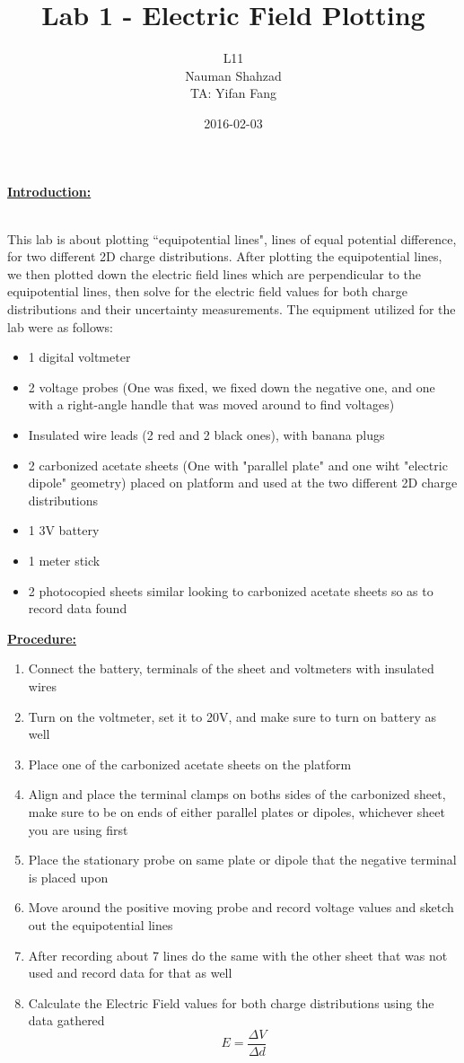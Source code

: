 \documentclass{report}
\title{\textbf{Lab 1 - Electric Field Plotting}}
\date{2016-02-03}
\author{L11\\ Nauman Shahzad\\TA: Yifan Fang}
\newcommand\tab[1][1cm]{\hspace*{#1}}
\begin{document}
\maketitle

\begin{flushleft}
{\Large \textbf{\underline{Introduction:}}}
\\\hspace{.1in}\\
{\large
 \tab This lab is about plotting ``equipotential lines", lines of equal potential difference, for two different 2D charge distributions.
After plotting the equipotential lines, we then plotted down the electric field lines which are perpendicular to the equipotential lines, then solve for the electric field values for both charge distributions and their uncertainty measurements.
The equipment utilized for the lab were as follows:
\begin{itemize}
\item 1 digital voltmeter
\item 2 voltage probes (One was fixed, we fixed down the negative one, and one with a right-angle handle that was moved around to find voltages)
\item Insulated wire leads (2 red and 2 black ones), with banana plugs
\item 2 carbonized acetate sheets (One with "parallel plate" and one wiht "electric dipole" geometry) placed on platform and used at the two different 2D charge distributions
\item 1 3V battery
\item 1 meter stick
\item 2 photocopied sheets similar looking to carbonized acetate sheets so as to record data found
\end{itemize}
}

\newpage

{\Large \textbf{\underline{Procedure:}}}
\\
{\large
\begin{enumerate}
\item Connect the battery, terminals of the sheet and voltmeters with insulated wires
\item Turn on the voltmeter, set it to 20V, and make sure to turn on battery as well
\item Place one of the carbonized acetate sheets on the platform
\item Align and place the terminal clamps on boths sides of the carbonized sheet, make sure to be on ends of either parallel plates or dipoles, whichever sheet you are using first
\item Place the stationary probe on same plate or dipole that the negative terminal is placed upon
\item Move around the positive moving probe and record voltage values and sketch out the equipotential lines
\item After recording about 7 lines do the same with the other sheet that was not used and record data for that as well
\item Calculate the Electric Field values for both charge distributions using the data gathered \[ E = \frac{\Delta V}{\Delta d}\]
\end{enumerate}
}


\end{flushleft}
\end{document}

